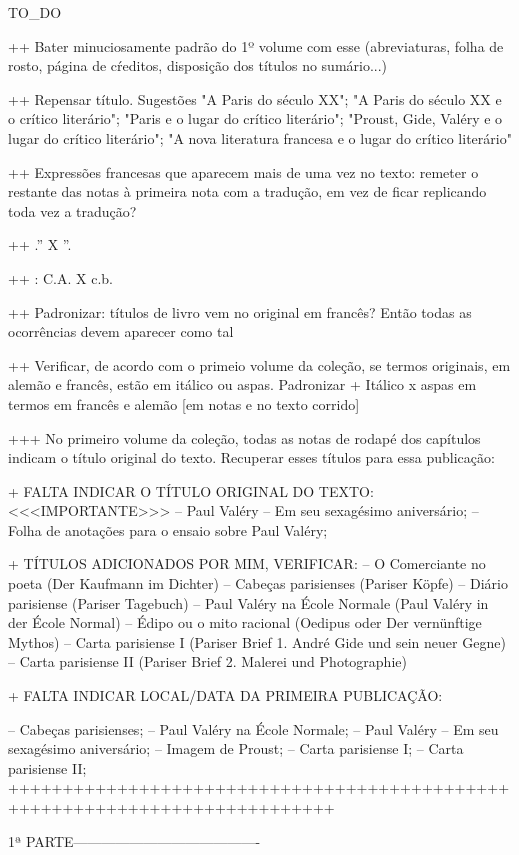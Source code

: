 TO_DO

++ Bater minuciosamente padrão do 1º volume com esse (abreviaturas, folha de rosto, página de cŕeditos, disposição dos títulos no sumário...)

++ Repensar título. Sugestões "A Paris do século XX"; "A Paris do século XX e o crítico literário"; "Paris e o lugar do crítico literário"; "Proust, Gide, Valéry e o lugar do crítico literário"; "A nova literatura francesa e o lugar do crítico literário"

++ Expressões francesas que aparecem mais de uma vez no texto: remeter o restante das notas à primeira nota com a tradução, em vez de ficar replicando toda vez a tradução?

++ .'' X ''.

++ : C.A. X c.b.

++ Padronizar: títulos de livro vem no original em francês? Então todas as ocorrências devem aparecer como tal

++ Verificar, de acordo com o primeio volume da coleção, se termos originais, em alemão e francês, estão em itálico ou aspas. Padronizar
+ Itálico x aspas em termos em francês e alemão [em notas e no texto corrido]

+++ No primeiro volume da coleção, todas as notas de rodapé dos capítulos indicam o título original do texto. Recuperar esses títulos para essa publicação:

+ FALTA INDICAR O TÍTULO ORIGINAL DO TEXTO: <<<IMPORTANTE>>>
-- Paul Valéry – Em seu sexagésimo aniversário;
-- Folha de anotações para o ensaio sobre Paul Valéry;

+ TÍTULOS ADICIONADOS POR MIM, VERIFICAR:
-- O Comerciante no poeta (Der Kaufmann im Dichter)
-- Cabeças parisienses (Pariser Köpfe)
-- Diário parisiense (Pariser Tagebuch)
-- Paul Valéry na École Normale (Paul Valéry in der École Normal)
-- Édipo ou o mito racional (Oedipus oder Der vernünftige Mythos)
-- Carta parisiense I (Pariser Brief 1. André Gide und sein neuer Gegne)
-- Carta parisiense II (Pariser Brief 2. Malerei und Photographie)

+ FALTA INDICAR LOCAL/DATA DA PRIMEIRA PUBLICAÇÃO:

-- Cabeças parisienses; 
-- Paul Valéry na École Normale;
-- Paul Valéry – Em seu sexagésimo aniversário;
-- Imagem de Proust; 
-- Carta parisiense I;
-- Carta parisiense II;
++++++++++++++++++++++++++++++++++++++++++++++++++++++++++++++++++++++++++++



1ª PARTE----------------------------------------

